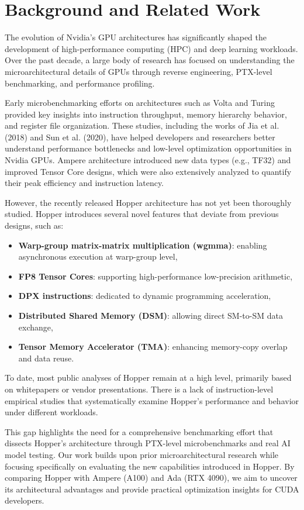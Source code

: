 \section{Background and Related Work}

The evolution of Nvidia's GPU architectures has significantly shaped the development of high-performance computing (HPC) and deep learning workloads. Over the past decade, a large body of research has focused on understanding the microarchitectural details of GPUs through reverse engineering, PTX-level benchmarking, and performance profiling.

Early microbenchmarking efforts on architectures such as Volta and Turing\cite{jia2018dissecting, sun2020turing} provided key insights into instruction throughput, memory hierarchy behavior, and register file organization. These studies, including the works of Jia et al. (2018) and Sun et al. (2020), have helped developers and researchers better understand performance bottlenecks and low-level optimization opportunities in Nvidia GPUs. Ampere architecture introduced new data types (e.g., TF32) and improved Tensor Core designs, which were also extensively analyzed to quantify their peak efficiency and instruction latency.

However, the recently released Hopper architecture has not yet been thoroughly studied. Hopper introduces several novel features that deviate from previous designs, such as:
\begin{itemize}
    \item \textbf{Warp-group matrix-matrix multiplication (wgmma)}: enabling asynchronous execution at warp-group level,
    \item \textbf{FP8 Tensor Cores}: supporting high-performance low-precision arithmetic,
    \item \textbf{DPX instructions}: dedicated to dynamic programming acceleration,
    \item \textbf{Distributed Shared Memory (DSM)}: allowing direct SM-to-SM data exchange,
    \item \textbf{Tensor Memory Accelerator (TMA)}: enhancing memory-copy overlap and data reuse.
\end{itemize}

To date, most public analyses of Hopper remain at a high level, primarily based on whitepapers or vendor presentations. There is a lack of instruction-level empirical studies that systematically examine Hopper's performance and behavior under different workloads.

This gap highlights the need for a comprehensive benchmarking effort that dissects Hopper's architecture through PTX-level microbenchmarks and real AI model testing. Our work builds upon prior microarchitectural research while focusing specifically on evaluating the new capabilities introduced in Hopper. By comparing Hopper with Ampere (A100) and Ada (RTX 4090), we aim to uncover its architectural advantages and provide practical optimization insights for CUDA developers.
